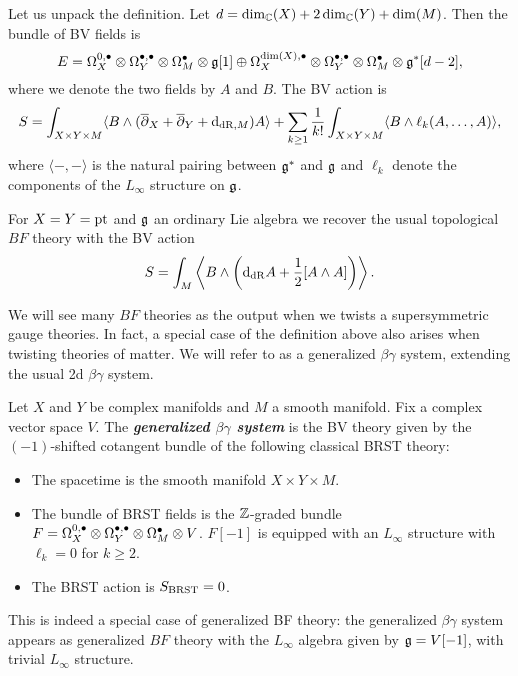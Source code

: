 \documentclass[10pt, oneside]{article}
\newcommand{\defterm}[1]{\textbf{\emph{#1}}}
\begin{document}
Let us unpack the definition. Let $d = \dim_\mathbb C(X) + 2\dim_\mathbb C(Y) + \dim(M)$. Then the bundle of BV fields is
\[E = \Omega^{0,\bullet}_X \otimes \Omega^{\bullet,\bullet}_Y \otimes \Omega^\bullet_M \otimes \mathfrak g[1]\oplus \Omega^{\dim(X),\bullet}_X \otimes \Omega^{\bullet,\bullet}_Y \otimes \Omega^\bullet_M\otimes \mathfrak g^*[d-2],\]
where we denote the two fields by $A$ and $B$. The BV action is
\[S = \int_{X\times Y\times M} \langle B\wedge (\overline{\partial}_X + \overline{\partial}_Y + {\rm d}_{\mathrm{dR}, M}) A\rangle + \sum_{k\geq 1}\frac{1}{k!} \int_{X\times Y\times M} \langle B\wedge \ell_k(A, \dots, A)\rangle,\]
where $\langle -, -\rangle$ is the natural pairing between $\mathfrak g^*$ and $\mathfrak g$ and $\ell_k$ denote the components of the $L_\infty$ structure on $\mathfrak g$.

\begin{example}
For $X=Y=\operatorname{pt}$ and $\mathfrak g$ an ordinary Lie algebra we recover the usual topological $BF$ theory with the BV action
\[S = \int_M \left\langle B\wedge \left({\rm d}_{\mathrm{dR}} A+ \frac{1}{2}[A\wedge A]\right)\right\rangle.\]
\end{example}

We will see many $BF$ theories as the output when we twists a supersymmetric gauge theories.
In fact, a special case of the definition above also arises when twisting theories of matter.  We will refer to as a generalized $\beta\gamma$ system, extending the usual 2d $\beta \gamma$ system. 

\begin{definition}
Let $X$ and $Y$ be complex manifolds and $M$ a smooth manifold. Fix a complex vector space $V$. The \defterm{generalized $\beta\gamma$ system} is the BV theory given by the $(-1)$-shifted cotangent bundle of the following classical BRST theory:
\begin{itemize}
\item The spacetime is the smooth manifold $X\times Y\times M$.

\item The bundle of BRST fields is the $\mathbb Z$-graded bundle $F = \Omega^{0,\bullet}_X \otimes \Omega^{\bullet,\bullet}_Y \otimes \Omega^\bullet_M \otimes V$. $F[-1]$ is equipped with an $L_\infty$ structure with $\ell_{k} = 0$ for $k \geq 2$. 

\item The BRST action is $S_{\mathrm{BRST}} = 0$.
\end{itemize}
\end{definition}

\begin{remark}
This is indeed a special case of generalized BF theory: the generalized $\beta\gamma$ system appears as generalized $BF$ theory with the $L_\infty$ algebra given by $\mathfrak g = V[-1]$, with trivial $L_\infty$ structure. 
\end{remark}
\end{document}
